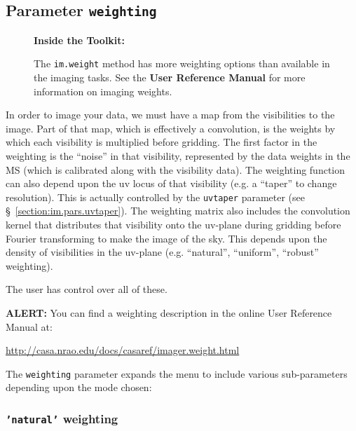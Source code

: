 \subsection{Parameter {\tt weighting} }
\label{section:im.pars.weighting}

\begin{wrapfigure}{r}{2.5in}
  \begin{boxedminipage}{2.5in}
     \centerline{\bf Inside the Toolkit:}
     The {\tt im.weight} method has more weighting options
     than available in the imaging tasks.  See the 
     {\bf User Reference Manual} for more information on
     imaging weights.
  \end{boxedminipage}
\end{wrapfigure}

In order to image your data, we must have a map from the visibilities
to the image.  Part of that map, which is effectively a convolution,
is the weights by which each visibility is multiplied before gridding.
The first factor in the weighting is the ``noise'' in that visibility,
represented by the data weights in the MS (which is calibrated along
with the visibility data).
The weighting function can also depend upon the uv locus of that visibility
(e.g. a ``taper'' to change resolution).  This is actually controlled
by the {\tt uvtaper} parameter (see \S~\ref{section:im.pars.uvtaper}).
The weighting matrix also includes the convolution kernel that
distributes that visibility onto the uv-plane during gridding before
Fourier transforming to make the image of the sky.  This depends upon
the density of visibilities in the uv-plane (e.g. ``natural'',
``uniform'', ``robust'' weighting).

The user has control over all of these.

{\bf ALERT:} You can find a weighting description in the online
User Reference Manual at:

\url{http://casa.nrao.edu/docs/casaref/imager.weight.html}


The {\tt weighting} parameter expands the menu to include various 
sub-parameters depending upon the mode chosen:

\subsubsection{{\tt 'natural'} weighting }
\label{section:im.pars.weighting.natural}


